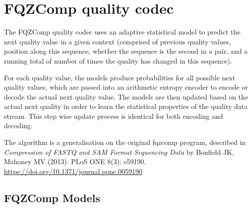 \documentclass[a4paper]{article}
\begin{document}
\section{FQZComp quality codec}

%
%
%
%
%
%
%
%

The FQZComp quality codec uses an adaptive statistical model to
predict the next quality value in a given context (comprised of
previous quality values, position along this sequence, whether the
sequence is the second in a pair, and a running total of number of
times the quality has changed in this sequence).

For each quality value, the models produce probabilities for all
possible next quality values, which are passed into an arithmetic
entropy encoder to encode or decode the actual next quality value.
The models are then updated based on the actual next quality in order
to learn the statistical properties of the quality data stream.  This
step wise update process is identical for both encoding and decoding.

The algorithm is a generalisation on the original fqzcomp program,
described in \textit{Compression of FASTQ and SAM Format Sequencing
  Data} by Bonfield JK, Mahoney MV (2013). PLoS ONE 8(3):
e59190. \url{https://doi.org/10.1371/journal.pone.0059190}

\subsection{FQZComp Models}
\end{document}
